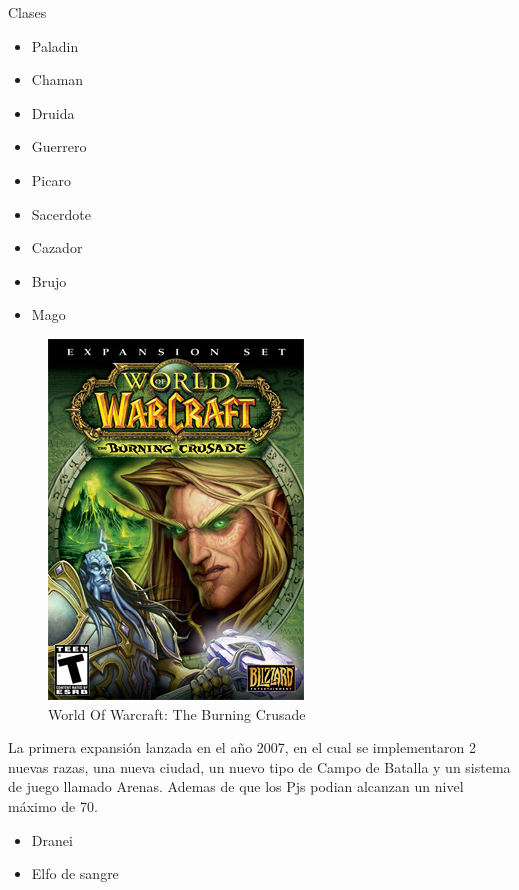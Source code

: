 \large{Clases}
\begin{itemize}
\item Paladin  \item Chaman  \item Druida  \item Guerrero
\item Picaro  \item Sacerdote  \item Cazador  \item Brujo  \item Mago
\end{itemize}
\newpage
\begin{figure}[htbp]
\begin{center}
\includegraphics[width=.60\textwidth]{./imagenes/wowtbc.jpg}
\caption{World Of Warcraft: The Burning Crusade}
\label{World Of Warcraft: The Burning Crusade}
\end{center}
\end{figure}
La primera expansión lanzada en el año 2007, en el cual se implementaron 2 nuevas razas, una nueva ciudad,  un nuevo tipo de Campo de Batalla y un sistema de juego llamado Arenas. Ademas de que los Pjs podian alcanzan un nivel máximo de 70.

\begin{itemize}
\item Dranei
\item Elfo de sangre
\end{itemize}

